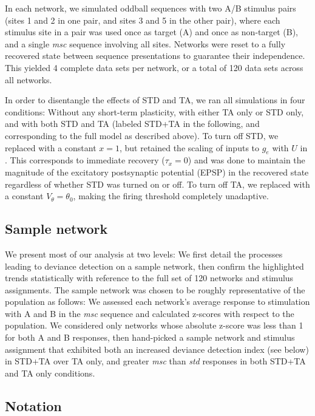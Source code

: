 \documentclass[9pt,lineno,onehalfspacing]{elife}
\newcommand{\msc}{\textit{msc}}
\newcommand{\std}{\textit{std}}
\begin{document}
In each network, we simulated oddball sequences with two A/B stimulus pairs (sites 1 and 2 in one pair, and sites 3 and 5 in the other pair), where each stimulus site in a pair was used once as target (A) and once as non-target (B), and a single \msc{} sequence involving all sites. Networks were reset to a fully recovered state between sequence presentations to guarantee their independence. This yielded 4 complete data sets per network, or a total of 120 data sets across all networks.

In order to disentangle the effects of STD and TA, we ran all simulations in four conditions: Without any short-term plasticity, with either TA only or STD only, and with both STD and TA (labeled STD+TA in the following, and corresponding to the full model as described above). To turn off STD, we replaced  with a constant $x = 1$, but retained the scaling of inputs to $g_e$ with $U$ in . This corresponds to immediate recovery ($\tau_x = 0$) and was done to maintain the magnitude of the excitatory postsynaptic potential (EPSP) in the recovered state regardless of whether STD was turned on or off. To turn off TA, we replaced  with a constant $V_{\theta} = \theta_0$, making the firing threshold completely unadaptive.

\subsection{Sample network}\label{sec:sample}

We present most of our analysis at two levels: We first detail the processes leading to deviance detection on a sample network, then confirm the highlighted trends statistically with reference to the full set of 120 networks and stimulus assignments. The sample network was chosen to be roughly representative of the population as follows: We assessed each network's average response to stimulation with A and B in the \msc{} sequence and calculated z-scores with respect to the population. We considered only networks whose absolute z-score was less than 1 for both A and B responses, then hand-picked a sample network and stimulus assignment that exhibited both an increased deviance detection index (see  below) in STD+TA over TA only, and greater \msc{} than \std{} responses in both STD+TA and TA only conditions.

\subsection{Notation}\label{sec:notation}
\end{document}
